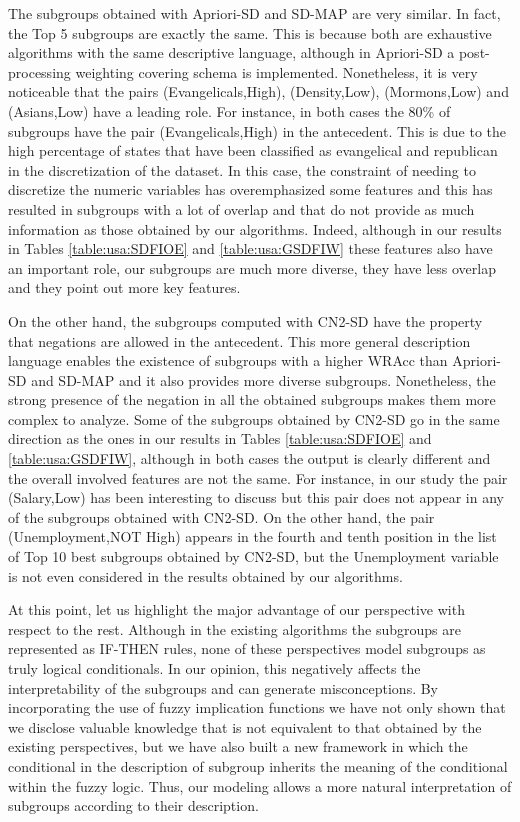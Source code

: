 The subgroups obtained with Apriori-SD and SD-MAP are very similar. In fact, the Top 5 subgroups are exactly the same. This is because both are exhaustive algorithms with the same descriptive language, although in Apriori-SD a post-processing weighting covering schema is implemented. Nonetheless, it is very noticeable that the pairs (Evangelicals,High), (Density,Low), (Mormons,Low) and (Asians,Low) have a leading role. For instance, in both cases the 80\% of subgroups have the pair (Evangelicals,High) in the antecedent. This is due to the high percentage of states that have been classified as evangelical and republican in the discretization of the dataset. In this case, the constraint of needing to discretize the numeric variables has overemphasized some features and this has resulted in subgroups with a lot of overlap and that do not provide as much information as those obtained by our algorithms. Indeed, although in our results in Tables \ref{table:usa:SDFIOE} and \ref{table:usa:GSDFIW} these features also have an important role, our subgroups are much more diverse, they have less overlap and they point out more key features.

On the other hand, the subgroups computed with CN2-SD have the property that negations are allowed in the antecedent. This more general description language enables the existence of subgroups with a higher WRAcc than Apriori-SD and SD-MAP and it also provides more diverse subgroups. Nonetheless, the strong presence of the negation in all the obtained subgroups makes them more complex to analyze. Some of the subgroups obtained by CN2-SD go in the same direction as the ones in our results in Tables \ref{table:usa:SDFIOE} and \ref{table:usa:GSDFIW}, although in both cases the output is clearly different and the overall involved features are not the same. For instance, in our study the pair (Salary,Low) has been interesting to discuss but this pair does not appear in any of the subgroups obtained with CN2-SD. On the other hand, the pair (Unemployment,NOT High) appears in the fourth and tenth position in the list of Top 10 best subgroups obtained by CN2-SD, but the Unemployment variable is not even considered in the results obtained by our algorithms.

At this point, let us highlight the major advantage of our perspective with respect to the rest. Although in the existing algorithms the subgroups are represented as IF-THEN rules, none of these perspectives model subgroups as truly logical conditionals. In our opinion, this negatively affects the interpretability of the subgroups and can generate misconceptions. By incorporating the use of fuzzy implication functions we have not only shown that we disclose valuable knowledge that is not equivalent to that obtained by the existing perspectives, but we have also built a new framework in which the conditional in the description of subgroup inherits the meaning of the conditional within the fuzzy logic. Thus, our modeling allows a more natural interpretation of subgroups according to their description.


